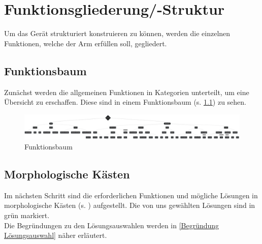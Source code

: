 \chapter{Funktionsgliederung/-Struktur}
	Um das Gerät strukturiert konstruieren zu können, werden die einzelnen Funktionen, welche der Arm erfüllen soll, gegliedert.

\section{Funktionsbaum}
	Zunächst werden die allgemeinen Funktionen in Kategorien unterteilt, um eine Übersicht zu erschaffen. Diese sind in einem Funktionsbaum (s. \cref{fig:funktionsbaum}) zu sehen.

	\begin{figure}[h]
		\centering
		\includegraphics[width=\textwidth]{"Abb/Funktionsbaum"}
		\caption[Funktionsbaum]{Funktionsbaum}
		\label{fig:funktionsbaum}
	\end{figure}


\section{Morphologische Kästen}
	Im nächsten Schritt sind die erforderlichen Funktionen und mögliche Lösungen in morphologische Kästen (s. ) aufgestellt. Die von uns gewählten Lösungen sind in grün markiert.\\
	Die Begründungen zu den Lösungsauswahlen werden in \cref{Begründung Lösungsauswahl} näher erläutert.

